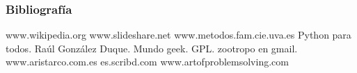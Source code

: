 \documentclass{beamer}
\begin{document}
\begin{frame}
  \frametitle{Bibliografía}
  \scriptsize
  \begin{thebibliography}{9}
   www.wikipedia.org
  www.slideshare.net
  www.metodos.fam.cie.uva.es
  Python para todos. Raúl González Duque. Mundo geek. GPL. zootropo en gmail. 
  www.aristarco.com.es
  es.scribd.com
  www.artofproblemsolving.com
  \end{thebibliography}
\end{frame}
\end{document}
